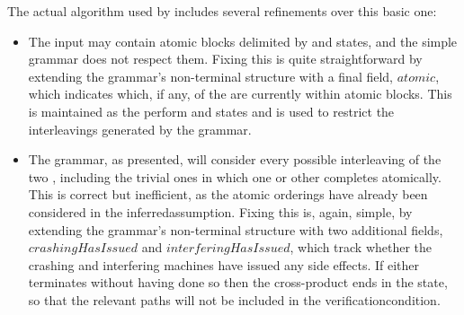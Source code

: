 The actual algorithm used by {\technique} includes several refinements
over this basic one:
\begin{itemize}
\item The input {\StateMachines} may contain atomic blocks delimited
  by {\stStartAtomic} and {\stEndAtomic} states, and the simple
  grammar does not respect them.  Fixing this is quite straightforward
  by extending the grammar's non-terminal structure with a final
  field, $\mathit{atomic}$, which indicates which, if any, of the
  {\StateMachines} are currently within atomic blocks.  This is
  maintained as the {\StateMachines} perform {\stStartAtomic} and
  {\stEndAtomic} states and is used to restrict the interleavings
  generated by the grammar.
\item The grammar, as presented, will consider every possible
  interleaving of the two {\StateMachines}, including the trivial ones
  in which one or other completes atomically.  This is correct but
  inefficient, as the atomic orderings have already been considered in
  the \gls{inferredassumption}.  Fixing this is, again, simple, by
  extending the grammar's non-terminal structure with two additional
  fields, $\mathit{crashingHasIssued}$ and
  $\mathit{interferingHasIssued}$, which track whether the crashing
  and interfering machines have issued any side
  effects.  If either {\StateMachine} terminates
  without having done so then the cross-product {\StateMachine} ends
  in the {\stUnreached} state, so that the relevant paths will not be
  included in the \gls{verificationcondition}.


\end{itemize}
